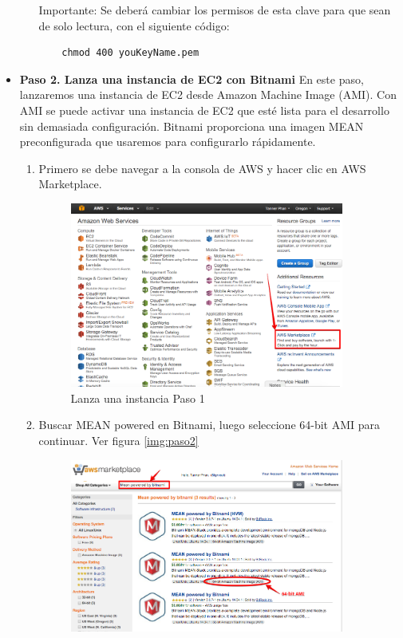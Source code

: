 \begin{itemize}
\begin{enumerate}
    Importante: Se deberá cambiar los permisos de esta clave para que sean de solo lectura, con el siguiente código:
    \begin{lstlisting}
    chmod 400 youKeyName.pem
    \end{lstlisting}
\end{enumerate}
    \item \textbf{Paso 2. Lanza una instancia de EC2 con Bitnami} En este paso, lanzaremos una instancia de EC2 desde Amazon Machine Image (AMI). Con AMI se puede activar una instancia de EC2 que esté lista para el desarrollo sin demasiada configuración. Bitnami proporciona una imagen MEAN preconfigurada que usaremos para configurarlo rápidamente.

    \begin{enumerate}
    \item Primero se debe navegar a la consola de AWS y hacer clic en AWS Marketplace.
    \begin{figure}[!h]
    \centering
    \includegraphics[width=90mm]{img/despliegue/paso2_1.png}
    \caption{Lanza una instancia Paso 1}
    \end{figure}
    \item Buscar MEAN powered en Bitnami, luego seleccione 64-bit AMI para continuar. Ver figura \ref{img:paso2}
    \begin{figure}[!h]
    \centering
    \includegraphics[width=90mm]{img/despliegue/paso2_2.png}

\end{figure}
\end{enumerate}
\end{itemize}
